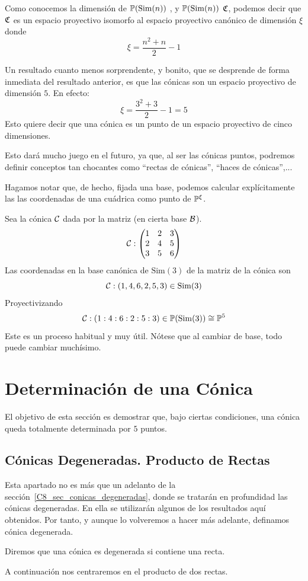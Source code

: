 Como conocemos la dimensión de $\mathbb{P}(\mathrm{Sim}(n))$ , y $\mathbb{P}(\mathrm{Sim}(n))$  $\mathfrak{C}$, podemos decir que $\mathfrak{C}$ es un espacio proyectivo isomorfo al espacio proyectivo canónico de dimensión $\xi$ donde \[\xi=\frac{n^2+n}{2}-1\]

\begin{obs}
	\label{C8_obs_conica_p5}
	Un resultado cuanto menos sorprendente, y bonito, que se desprende de forma inmediata del resultado anterior, es que las cónicas son un espacio proyectivo de dimensión $5$. En efecto:
	\[\xi=\frac{3^2+3}{2}-1=5\]
	Esto quiere decir que una cónica es un punto de un espacio proyectivo de cinco dimensiones.
	
	Esto dará mucho juego en el futuro, ya que, al ser las cónicas puntos, podremos definir conceptos tan chocantes como ``rectas de cónicas'', ``haces de cónicas'',...
\end{obs}
Hagamos notar que, de hecho, fijada una base, podemos calcular explícitamente las las coordenadas de una cuádrica como punto de $\mathbb{P}^\xi$.
\begin{exa}
	\label{C8_exa_coordenadas_conica_p5}
	Sea la cónica $\mathcal{C}$ dada por la matriz (en cierta base $\mathcal{B}$).
	\[\mathcal{C}:\begin{pmatrix}
	1 & 2 & 3\\
	2 & 4 & 5\\
	3 & 5 & 6
	\end{pmatrix}\]
	Las coordenadas en la base canónica de $\mathrm{Sim}(3)$ de la matriz de la cónica son
	\[\mathcal{C}:(1,4,6,2,5,3)\in\mathrm{Sim}(3)\]
	Proyectivizando
	\[\mathcal{C}:(1:4:6:2:5:3)\in\mathbb{P}(\mathrm{Sim}(3))\cong\mathbb{P}^5\]
	Este es un proceso habitual y muy útil. Nótese que al cambiar de base, todo puede cambiar muchísimo.
\end{exa}
\section{Determinación de una Cónica}
El objetivo de esta sección es demostrar que, bajo ciertas condiciones, una cónica queda totalmente determinada por $5$ puntos.
\subsection{Cónicas Degeneradas. Producto de Rectas}
\label{C8_subsec_producto_rectas}
Esta apartado no es más que un adelanto de la sección~\ref{C8_sec_conicas_degeneradas}, donde se tratarán en profundidad las cónicas degeneradas. En ella se utilizarán algunos de los resultados aquí obtenidos. Por tanto, y aunque lo volveremos a hacer más adelante, definamos cónica degenerada.
\begin{defi} 
	Diremos que una cónica es degenerada si contiene una recta.
\end{defi}
A continuación nos centraremos en el producto de dos rectas.

